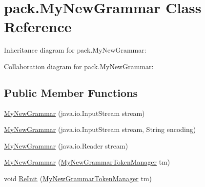 \hypertarget{classpack_1_1_my_new_grammar}{}\section{pack.\+My\+New\+Grammar Class Reference}
\label{classpack_1_1_my_new_grammar}


Inheritance diagram for pack.\+My\+New\+Grammar\+:


Collaboration diagram for pack.\+My\+New\+Grammar\+:
\subsection*{Public Member Functions}
\begin{DoxyCompactItemize}
\item 
\hyperlink{classpack_1_1_my_new_grammar_a95e9b57992a76e14a2f4e1c9e180d9fc}{My\+New\+Grammar} (java.\+io.\+Input\+Stream stream)
\item 
\hyperlink{classpack_1_1_my_new_grammar_a719a128250a12590d04054f22317882f}{My\+New\+Grammar} (java.\+io.\+Input\+Stream stream, String encoding)
\item 
\hyperlink{classpack_1_1_my_new_grammar_ae01915587569a6915ea4a614a4c2bb9c}{My\+New\+Grammar} (java.\+io.\+Reader stream)
\item 
\hyperlink{classpack_1_1_my_new_grammar_abca14b76a77da5af73e9e98aed1a88d5}{My\+New\+Grammar} (\hyperlink{classpack_1_1_my_new_grammar_token_manager}{My\+New\+Grammar\+Token\+Manager} tm)
\item 
void \hyperlink{classpack_1_1_my_new_grammar_ae422d695698ae24c5faf9a9c1aad340e}{Re\+Init} (\hyperlink{classpack_1_1_my_new_grammar_token_manager}{My\+New\+Grammar\+Token\+Manager} tm)
\end{DoxyCompactItemize}
